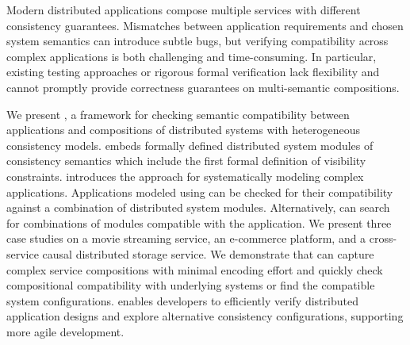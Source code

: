 Modern distributed applications compose multiple services with
different consistency guarantees. Mismatches between application
requirements and chosen system semantics can introduce subtle bugs,
but verifying compatibility across complex applications is both
challenging and time-consuming. In particular, existing testing approaches
or rigorous formal verification lack flexibility and cannot
promptly provide correctness guarantees on multi-semantic compositions.

We present \sysname{}, a framework for checking semantic
compatibility between applications and compositions of distributed
systems with heterogeneous consistency models. \sysname{} embeds
formally defined distributed system modules of
consistency semantics which include the first formal definition of
visibility constraints. \sysname{} introduces the \sysgraph{} approach for
systematically modeling complex applications. Applications modeled
using \sysgraphs{} can be checked for their compatibility against a
combination of distributed system modules. Alternatively, \sysname{}
can search for combinations of modules compatible with the application.
We present three case studies on a movie streaming service, an
e-commerce platform, and a cross-service causal distributed storage service.
We demonstrate that \sysname{} can capture complex service compositions
with minimal encoding effort and quickly check compositional compatibility with
underlying systems or find the compatible system configurations. \sysname{}
enables developers to efficiently verify distributed application designs
and explore alternative consistency configurations, supporting more
agile development.
